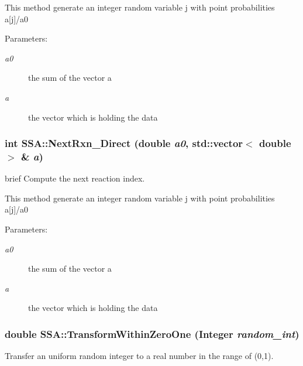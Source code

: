 This method generate an integer random variable j with point probabilities a\mbox{[}j\mbox{]}/a0

\begin{Desc}
\item[Parameters:]
\begin{description}
\item[{\em a0}]the sum of the vector a \item[{\em a}]the vector which is holding the data \end{description}
\end{Desc}
\hypertarget{class_s_s_a_95c1dc3e657f3e8c5f2299f4f5973461}{
\subsubsection{\setlength{\rightskip}{0pt plus 5cm}int SSA::NextRxn\_\-Direct (double {\em a0}, \/  std::vector$<$ double $>$ \& {\em a})}}
\label{class_s_s_a_95c1dc3e657f3e8c5f2299f4f5973461}


brief Compute the next reaction index.

This method generate an integer random variable j with point probabilities a\mbox{[}j\mbox{]}/a0

\begin{Desc}
\item[Parameters:]
\begin{description}
\item[{\em a0}]the sum of the vector a \item[{\em a}]the vector which is holding the data \end{description}
\end{Desc}
\hypertarget{class_s_s_a_c29b87a5248207915e35a00689a3b940}{
\subsubsection{\setlength{\rightskip}{0pt plus 5cm}double SSA::TransformWithinZeroOne ({\bf Integer} {\em random\_\-int})}}
\label{class_s_s_a_c29b87a5248207915e35a00689a3b940}


Transfer an uniform random integer to a real number in the range of (0,1). 


